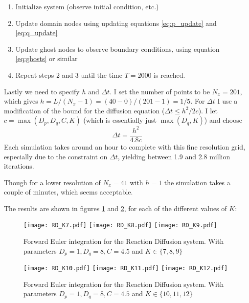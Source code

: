 \documentclass[a4paper,10pt]{article}
\begin{document}
	\begin{enumerate}
		\item Initialize system (observe initial condition, etc.)
		\item Update domain nodes using updating equations \ref{eq:p_update} and \ref{eq:q_update}
		\item Update ghost nodes to observe boundary conditions, using equation \ref{eq:ghosts} or similar
		\item Repeat steps 2 and 3 until the time $ T=2000 $ is reached.
	\end{enumerate}
	Lastly we need to specify $ h $ and $ \Delta t $. I set the number of points to be $ N_x=201 $, which gives $ h = L/(N_x-1) = (40-0)/(201-1) =  1/5 $. For $ \Delta t $ I use a modification of the bound for the diffusion equation ($ \Delta t \leq h^2/2c $). I let $ c = \max (D_p, D_q, C, K) $ (which is essentially just $ \max(D_q, K) $) and choose
	\begin{equation}
		\Delta t = \frac{h^2}{4.8c}
	\end{equation}
	Each simulation takes around an hour to complete with this fine resolution grid, especially due to the constraint on $ \Delta t $, yielding between 1.9 and 2.8 million iterations.
	
	Though for a lower resolution of $ N_x = 41 $ with $ h = 1 $ the simulation takes a couple of minutes, which seems acceptable.
	
	The results are shown in figures \ref{fig:RD1} and \ref{fig:RD2}, for each of the different values of $ K $:
	\begin{figure}[H]
		\centering
		\texttt{[image: RD\_K7.pdf]}
		\texttt{[image: RD\_K8.pdf]}
		\texttt{[image: RD\_K9.pdf]}
		\caption{Forward Euler integration for the Reaction Diffusion system. With parameters $ D_p=1, D_q = 8, C=4.5 $ and $ K \in \{7,8,9\} $}
		\label{fig:RD1}
	\end{figure}

	\begin{figure}[H]
		\centering
		\texttt{[image: RD\_K10.pdf]}
		\texttt{[image: RD\_K11.pdf]}
		\texttt{[image: RD\_K12.pdf]}
		\caption{Forward Euler integration for the Reaction Diffusion system. With parameters $ D_p=1, D_q = 8, C=4.5 $ and $ K \in \{10,11,12\} $}
		\label{fig:RD2}
	\end{figure}
\end{document}

